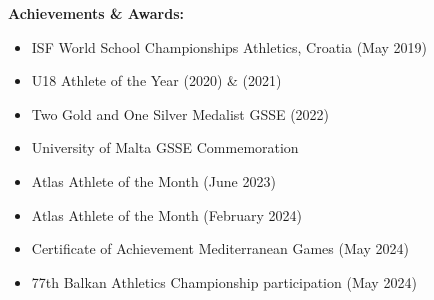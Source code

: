 \documentclass[11pt,a4paper]{article}
\begin{document}
\textbf{Achievements \& Awards:}
\begin{itemize}
  \item ISF World School Championships Athletics, Croatia (May 2019)
  \item U18 Athlete of the Year (2020) \& (2021)
  \item Two Gold and One Silver Medalist GSSE (2022)
  \item University of Malta GSSE Commemoration
  \item Atlas Athlete of the Month (June 2023)
  \item Atlas Athlete of the Month (February 2024)
  \item Certificate of Achievement Mediterranean Games (May 2024)
  \item 77th Balkan Athletics Championship participation (May 2024)
\end{itemize}
\end{document}
